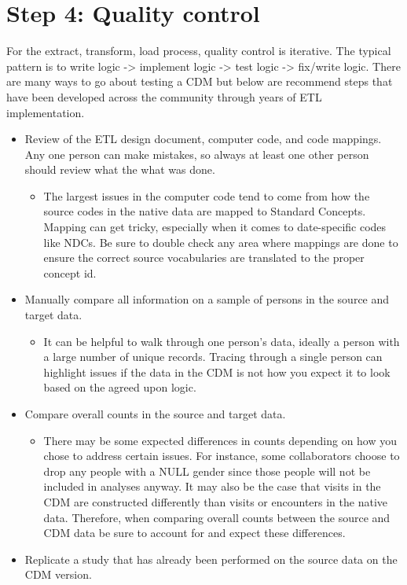 \documentclass[11pt]{book}
\providecommand{\tightlist}{%
  \setlength{\itemsep}{0pt}\setlength{\parskip}{0pt}}
\theoremstyle{definition}
\theoremstyle{definition}
\theoremstyle{definition}
\theoremstyle{remark}
\begin{document}
\hypertarget{step-4-quality-control}{%
\section{Step 4: Quality control}\label{step-4-quality-control}}

For the extract, transform, load process, quality control is iterative. The typical pattern is to write logic -\textgreater{} implement logic -\textgreater{} test logic -\textgreater{} fix/write logic. There are many ways to go about testing a CDM but below are recommend steps that have been developed across the community through years of ETL implementation. 

\begin{itemize}
\tightlist
\item
  Review of the ETL design document, computer code, and code mappings. Any one person can make mistakes, so always at least one other person should review what the what was done.

  \begin{itemize}
  \tightlist
  \item
    The largest issues in the computer code tend to come from how the source codes in the native data are mapped to Standard Concepts. Mapping can get tricky, especially when it comes to date-specific codes like NDCs. Be sure to double check any area where mappings are done to ensure the correct source vocabularies are translated to the proper concept id.\\
  \end{itemize}
\item
  Manually compare all information on a sample of persons in the source and target data.

  \begin{itemize}
  \tightlist
  \item
    It can be helpful to walk through one person's data, ideally a person with a large number of unique records. Tracing through a single person can highlight issues if the data in the CDM is not how you expect it to look based on the agreed upon logic.
  \end{itemize}
\item
  Compare overall counts in the source and target data.

  \begin{itemize}
  \tightlist
  \item
    There may be some expected differences in counts depending on how you chose to address certain issues. For instance, some collaborators choose to drop any people with a NULL gender since those people will not be included in analyses anyway. It may also be the case that visits in the CDM are constructed differently than visits or encounters in the native data. Therefore, when comparing overall counts between the source and CDM data be sure to account for and expect these differences.\\
  \end{itemize}
\item
  Replicate a study that has already been performed on the source data on the CDM version.


\end{itemize}
\end{document}
